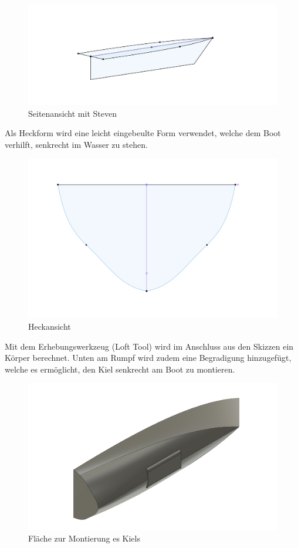 \begin{figure}[H]
    \centering
    \includegraphics[width=1\linewidth]{assets/boot_skizze_2.png}
    \caption{Seitenansicht mit Steven}
    
\end{figure}

Als Heckform wird eine leicht eingebeulte Form verwendet, welche dem Boot verhilft, senkrecht im Wasser zu stehen.

\begin{figure}[H]
    \centering
    \includegraphics[width=0.6\linewidth]{assets/Heck_boot.png}
    \caption{Heckansicht}
   
\end{figure}

Mit dem Erhebungswerkzeug (Loft Tool) wird im Anschluss aus den Skizzen ein Körper berechnet. Unten am Rumpf wird zudem eine Begradigung hinzugefügt, welche es ermöglicht, den Kiel senkrecht am Boot zu montieren.
\begin{figure}[H]
    \centering
    \includegraphics[width=0.75\linewidth]{assets/kielbefestigung2image.png}
    \caption{Fläche zur Montierung es Kiels}
    \label{fig:enter-label}
\end{figure}

